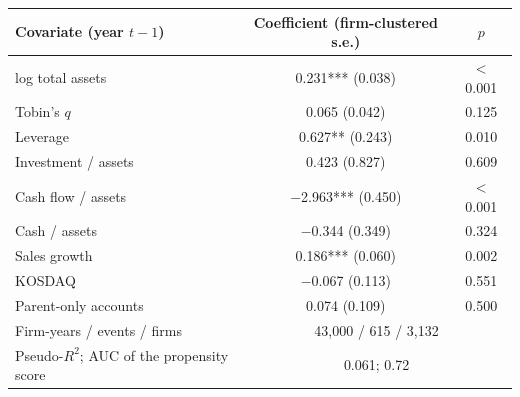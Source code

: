 \begin{tabular}{lcc}
\toprule
Covariate (year $t-1$) & Coefficient (firm-clustered s.e.) & $p$ \\
\midrule
log total assets & 0.231*** (0.038) & $<$0.001 \\
Tobin's $q$ & 0.065 (0.042) & 0.125 \\
Leverage & 0.627** (0.243) & 0.010 \\
Investment / assets & 0.423 (0.827) & 0.609 \\
Cash flow / assets & $-$2.963*** (0.450) & $<$0.001 \\
Cash / assets & $-$0.344 (0.349) & 0.324 \\
Sales growth & 0.186*** (0.060) & 0.002 \\
KOSDAQ & $-$0.067 (0.113) & 0.551 \\
Parent-only accounts & 0.074 (0.109) & 0.500 \\
\midrule
Firm-years / events / firms & \multicolumn{2}{c}{43,000 / 615 / 3,132} \\
Pseudo-$R^2$; AUC of the propensity score & \multicolumn{2}{c}{0.061; 0.72} \\
\bottomrule
\end{tabular}
